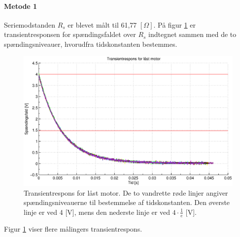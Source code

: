 \paragraph{Metode 1}
Seriemodstanden \(R_s\) er blevet målt til 61,77 \([\Omega]\).
På figur \ref{fig:induktans0} er transientresponsen for spændingsfaldet over \(R_s\) indtegnet
sammen med de to spændingsniveauer, hvorudfra tidskonstanten bestemmes.
\begin{figure}[th!]
	\centering
	\includegraphics[width=1\textwidth]{./graphics/induktans0.eps}
	\caption[Transientrespons for låst motor]
		{Transientrespons for låst motor. De to vandrette røde linjer angiver spændingsniveauerne til bestemmelse af tidskonstanten.
		Den øverste linje er ved 4 [V], mens den nederste linje er ved \(4\cdot \frac{1}{e}\)  [V].}
	\label{fig:induktans0}
\end{figure}
Figur \ref{fig:induktans0} viser flere målingers transientrespons.

